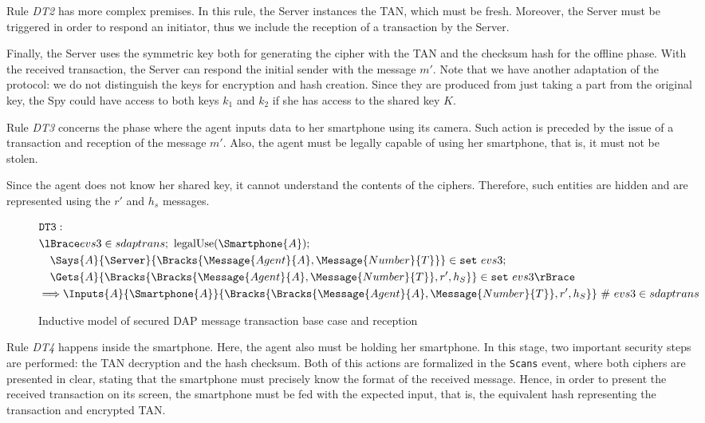 Rule \textit{DT2} has more complex premises. In this rule, the Server instances the TAN, which must be fresh. Moreover, the Server must be triggered in order to respond an initiator, thus we include the reception of a transaction by the Server. 

Finally, the Server uses the symmetric key both for generating the cipher with the TAN and the checksum hash for the offline phase. With the received transaction, the Server can respond the initial sender with the message \(m'\). Note that we have another adaptation of the protocol: we do not distinguish the keys for encryption and hash creation. Since they are produced from just taking a part from the original key, the Spy could have access to both keys \(k_1\) and \(k_2\) if she has access to the shared key \(K\).

Rule \textit{DT3} concerns the phase where the agent inputs data to her smartphone using its camera. Such action is preceded by the issue of a transaction and reception of the message \(m'\). Also, the agent must be legally capable of using her smartphone, that is, it must not be stolen.

Since the agent does not know her shared key, it cannot understand the contents of the ciphers. Therefore, such entities are hidden and are represented using the \(r'\) and \(h_s\) messages.

\begin{figure}[h!]
  \begin{align*}
    & \texttt{DT3}: \newline \\
    & \lBrace evs3 \in sdaptrans;\ \text{legalUse}(\Smartphone{A}); \\
    & \quad \Says{A}{\Server}{\Bracks{\Message{Agent}{A}, \Message{Number}{T}}} \in \texttt{set} \ evs3; \\
    & \quad \Gets{A}{\Bracks{\Bracks{\Message{Agent}{A}, \Message{Number}{T}}, r', h_S}} \in \texttt{set} \ evs3 \rBrace \\
    & \Longrightarrow \Inputs{A}{\Smartphone{A}}{\Bracks{\Bracks{\Message{Agent}{A}, \Message{Number}{T}}, r', h_S}}   \ \# \ evs3 \in sdaptrans
  \end{align*}
  \label{fig:dap-model-3}
  \caption{Inductive model of secured DAP message transaction base case and reception}
\end{figure}

Rule \textit{DT4} happens inside the smartphone. Here, the agent also must be holding her smartphone. In this stage, two important security steps are performed: the TAN decryption and the hash checksum. Both of this actions are formalized in the \texttt{Scans} event, where both ciphers are presented in clear, stating that the smartphone must precisely know the format of the received message. Hence, in order to present the received transaction on its screen, the smartphone must be fed with the expected input, that is, the equivalent hash representing the transaction and encrypted TAN.

